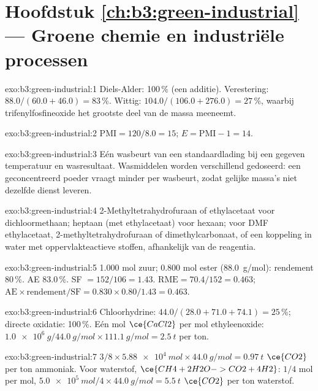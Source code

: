 \section*{Hoofdstuk \ref{ch:b3:green-industrial} --- Groene chemie en industriële processen}

\begin{solution}{exo:b3:green-industrial:1}
Diels-Alder: 100\,\% (een additie). Verestering: $88.0/(60.0 + 46.0) = 83$\,\%. Wittig:
$104.0/(106.0 + 276.0) = 27$\,\%, waarbij trifenylfosfineoxide het grootste deel van de massa meeneemt.
\end{solution}

\begin{solution}{exo:b3:green-industrial:2}
$\mathrm{PMI} = 120/8.0 = 15$; $E = \mathrm{PMI} - 1 = 14$.
\end{solution}

\begin{solution}{exo:b3:green-industrial:3}
Eén wasbeurt van een standaardlading bij een gegeven temperatuur en
wasresultaat. Wasmiddelen worden verschillend gedoseerd: een
geconcentreerd poeder vraagt minder per wasbeurt, zodat gelijke massa's
niet dezelfde dienst leveren.
\end{solution}

\begin{solution}{exo:b3:green-industrial:4}
2-Methyltetrahydrofuraan of ethylacetaat voor dichloormethaan; heptaan
(met ethylacetaat) voor hexaan; voor DMF ethylacetaat,
2-methyltetrahydrofuraan of dimethylcarbonaat, of een koppeling in water
met oppervlakteactieve stoffen, afhankelijk van de reagentia.
\end{solution}

\begin{solution}{exo:b3:green-industrial:5}
1.000 mol zuur; 0.800 mol ester (\qty{88.0}{g/mol}): rendement 80\,\%. AE 83.0\,\%. SF $= 152/106 = 1.43$.
$\mathrm{RME} = 70.4/152 = 0.463$; $\mathrm{AE} \times \text{rendement}/\mathrm{SF} = 0.830 \times 0.80/1.43 = 0.463$.
\end{solution}

\begin{solution}{exo:b3:green-industrial:6}
Chloorhydrine: $44.0/(28.0 + 71.0 + 74.1) = 25$\,\%; directe oxidatie: 100\,\%. Eén mol $\ce{CaCl2}$ per mol
ethyleenoxide: $\qty{1.0e6}{g}/\qty{44.0}{g/mol} \times \qty{111.1}{g/mol} = \qty{2.5}{t}$ per ton.
\end{solution}

\begin{solution}{exo:b3:green-industrial:7}
$3/8 \times \qty{5.88e4}{mol} \times \qty{44.0}{g/mol} = \qty{0.97}{t}$ $\ce{CO2}$ per ton ammoniak. Voor waterstof, $\ce{CH4 + 2H2O -> CO2 + 4H2}$:
$1/4$ mol per mol, $\qty{5.0e5}{mol}/4 \times \qty{44.0}{g/mol} = \qty{5.5}{t}$ $\ce{CO2}$ per ton waterstof.
\end{solution}

